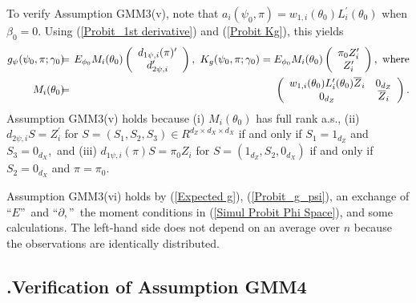 \documentclass[12pt,thmsb,titlepage,final,oneside,letterpaper]{article}
\begin{document}
To verify Assumption GMM3(v), note that $a_{i}(\psi _{0},\pi
)=w_{1,i}(\theta _{0})L_{i}^{\prime }(\theta _{0})$ when $\beta _{0}=0.$
Using (\ref{Probit_1st derivative}) and (\ref{Probit Kg}), this yields%
\begin{eqnarray}
g_{\psi }(\psi _{0},\pi ;\gamma _{0})\hspace{-0.08in} &=&\hspace{-0.08in}%
E_{\phi _{0}}M_{i}(\theta _{0})\left( 
\begin{array}{c}
d_{1\psi ,i}(\pi )^{\prime } \\ 
d_{2\psi ,i}^{\prime }%
\end{array}%
\right) ,\text{ }K_{g}(\psi _{0},\pi ;\gamma _{0})=E_{\phi _{0}}M_{i}(\theta
_{0})\left( 
\begin{array}{c}
\pi _{0}Z_{i}^{\prime } \\ 
Z_{i}^{\prime }%
\end{array}%
\right) ,\text{ where}  \notag \\
M_{i}(\theta _{0})\hspace{-0.08in} &=&\hspace{-0.08in}\left( 
\begin{array}{cc}
w_{1,i}(\theta _{0})L_{i}^{\prime }(\theta _{0})\overline{Z}_{i} & 0_{d_{Z}}
\\ 
0_{d_{Z}} & \overline{Z}_{i}%
\end{array}%
\right) .  \label{Probit_g_psi}
\end{eqnarray}%
Assumption GMM3(v) holds because (i) $M_{i}(\theta _{0})$ has full rank
a.s., (ii) $d_{2\psi ,i}S=Z_{i}^{\prime }$ for $S=(S_{1},S_{2},S_{3})\in
R^{d_{Z}\times d_{X}\times d_{X}}$ if and only if $S_{1}=1_{d_{Z}}$ and $%
S_{3}=0_{d_{X}},$ and (iii) $d_{1\psi ,i}(\pi )S=\pi _{0}Z_{i}$ for $%
S=(1_{d_{Z}},S_{2},0_{d_{X}})$ if and only if $S_{2}=0_{d_{X}}$ and $\pi
=\pi _{0}.$

Assumption GMM3(vi) holds by (\ref{Expected g}), (\ref{Probit_g_psi}), an
exchange of \textquotedblleft $E$\textquotedblright\ and \textquotedblleft $%
\partial ,$\textquotedblright\ the moment conditions in (\ref{Simul Probit
Phi Space}), and some calculations. The left-hand side does not depend on an
average over $n$ because the observations are identically distributed.

\subsection{\hspace{-0.23in}\textbf{.}\hspace{0.18in}Verification of
Assumption GMM4}
\end{document}
